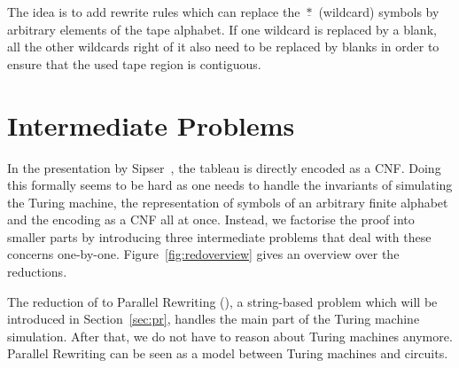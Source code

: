 \begin{center}
\end{center}

The idea is to add rewrite rules which can replace the $\underline{*}$ (wildcard) symbols by arbitrary elements of the tape alphabet. If one wildcard is replaced by a blank, all the other wildcards right of it also need to be replaced by blanks in order to ensure that the used tape region is contiguous. 

\section{Intermediate Problems}
In the presentation by Sipser~\cite{Sipser:TheoryofComputation}, the tableau is directly encoded as a CNF. Doing this formally seems to be hard as one needs to handle the invariants of simulating the Turing machine, the representation of symbols of an arbitrary finite alphabet and the encoding as a CNF all at once. 
Instead, we factorise the proof into smaller parts by introducing three intermediate problems that deal with these concerns one-by-one. 
Figure~\ref{fig:redoverview} gives an overview over the reductions.

The reduction of \gennp{} to Parallel Rewriting (\PR{}), a string-based problem which will be introduced in Section~\ref{sec:pr}, handles the main part of the Turing machine simulation. After that, we do not have to reason about Turing machines anymore. 
Parallel Rewriting can be seen as a model between Turing machines and circuits.

